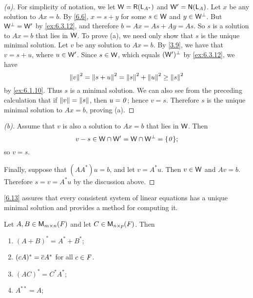 \begin{proof}[(a)]
  For simplicity of notation, we let \(\W = \rg{\L_{A^*}}\) and \(\W' = \ns{\L_A}\).
  Let \(x\) be any solution to \(Ax = b\).
  By \cref{6.6}, \(x = s + y\) for some \(s \in \mathsf{W}\) and \(y \in \mathsf{W}^{\perp}\).
  But \(\mathsf{W}^{\perp} = \mathsf{W}'\) by \cref{ex:6.3.12}, and therefore \(b = Ax = As + Ay = As\).
  So \(s\) is a solution to \(Ax = b\) that lies in \(\mathsf{W}\).
  To prove (a), we need only show that \(s\) is the unique minimal solution.
  Let \(v\) be any solution to \(Ax = b\).
  By \cref{3.9}, we have that \(v = s + u\), where \(u \in \mathsf{W}'\).
  Since \(s \in \mathsf{W}\), which equals \((\mathsf{W}')^{\perp}\) by \cref{ex:6.3.12}, we have
  \[
    \left\lVert v\right\rVert^2 = \left\lVert s + u\right\rVert^2 = \left\lVert s\right\rVert^2 + \left\lVert u\right\rVert^2 \geq \left\lVert s\right\rVert^2
  \]
  by \cref{ex:6.1.10}.
  Thus \(s\) is a minimal solution.
  We can also see from the preceding calculation that if \(\left\lVert v\right\rVert = \left\lVert s\right\rVert\), then \(u = \mathit{0}\);
  hence \(v = s\).
  Therefore \(s\) is the unique minimal solution to \(Ax = b\), proving (a).
\end{proof}

\begin{proof}[(b)]
  Assume that \(v\) is also a solution to \(Ax = b\) that lies in \(\mathsf{W}\).
  Then
  \[
    v - s \in \W \cap \W' = \W \cap \W^{\perp} = \set{\zv};
  \]
  so \(v = s\).

  Finally, suppose that \((A A^*) u = b\), and let \(v = A^* u\).
  Then \(v \in \mathsf{W}\) and \(Av = b\).
  Therefore \(s = v = A^* u\) by the discussion above.
\end{proof}

\begin{note}
  \cref{6.13} assures that every consistent system of linear equations has a unique minimal solution and provides a method for computing it.
\end{note}

\exercisesection

\setcounter{ex}{4}
\begin{ex}\label{ex:6.3.5}
  Let \(A, B \in \mathsf{M}_{{m} \times n}({\mathit{F}})\) and let \(C \in \mathsf{M}_{{n} \times p}({\mathit{F}})\).
  Then
  \begin{enumerate}
    \item \((A + B)^* = A^* + B^*\);
    \item \((cA)^* = \overline{c} A^*\) for all \(c \in \mathit{F}\).
    \item \((AC)^* = C^* A^*\);
    \item \(A^{**} = A\);
  \end{enumerate}
\end{ex}

